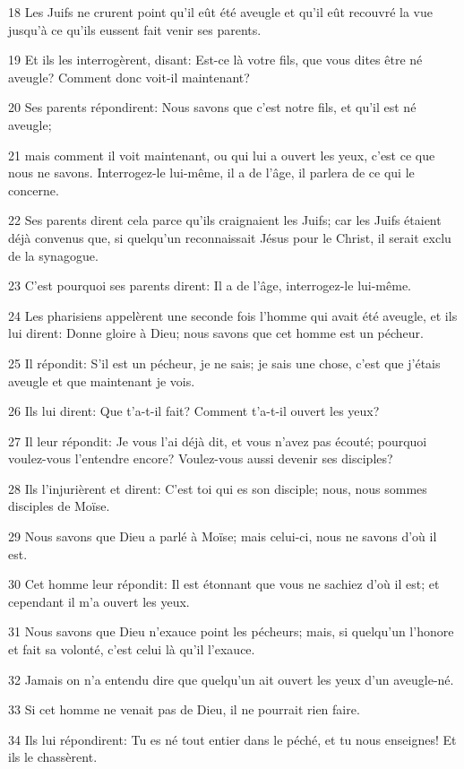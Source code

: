 \par 18 Les Juifs ne crurent point qu'il eût été aveugle et qu'il eût recouvré la vue jusqu'à ce qu'ils eussent fait venir ses parents.
\par 19 Et ils les interrogèrent, disant: Est-ce là votre fils, que vous dites être né aveugle? Comment donc voit-il maintenant?
\par 20 Ses parents répondirent: Nous savons que c'est notre fils, et qu'il est né aveugle;
\par 21 mais comment il voit maintenant, ou qui lui a ouvert les yeux, c'est ce que nous ne savons. Interrogez-le lui-même, il a de l'âge, il parlera de ce qui le concerne.
\par 22 Ses parents dirent cela parce qu'ils craignaient les Juifs; car les Juifs étaient déjà convenus que, si quelqu'un reconnaissait Jésus pour le Christ, il serait exclu de la synagogue.
\par 23 C'est pourquoi ses parents dirent: Il a de l'âge, interrogez-le lui-même.
\par 24 Les pharisiens appelèrent une seconde fois l'homme qui avait été aveugle, et ils lui dirent: Donne gloire à Dieu; nous savons que cet homme est un pécheur.
\par 25 Il répondit: S'il est un pécheur, je ne sais; je sais une chose, c'est que j'étais aveugle et que maintenant je vois.
\par 26 Ils lui dirent: Que t'a-t-il fait? Comment t'a-t-il ouvert les yeux?
\par 27 Il leur répondit: Je vous l'ai déjà dit, et vous n'avez pas écouté; pourquoi voulez-vous l'entendre encore? Voulez-vous aussi devenir ses disciples?
\par 28 Ils l'injurièrent et dirent: C'est toi qui es son disciple; nous, nous sommes disciples de Moïse.
\par 29 Nous savons que Dieu a parlé à Moïse; mais celui-ci, nous ne savons d'où il est.
\par 30 Cet homme leur répondit: Il est étonnant que vous ne sachiez d'où il est; et cependant il m'a ouvert les yeux.
\par 31 Nous savons que Dieu n'exauce point les pécheurs; mais, si quelqu'un l'honore et fait sa volonté, c'est celui là qu'il l'exauce.
\par 32 Jamais on n'a entendu dire que quelqu'un ait ouvert les yeux d'un aveugle-né.
\par 33 Si cet homme ne venait pas de Dieu, il ne pourrait rien faire.
\par 34 Ils lui répondirent: Tu es né tout entier dans le péché, et tu nous enseignes! Et ils le chassèrent.
